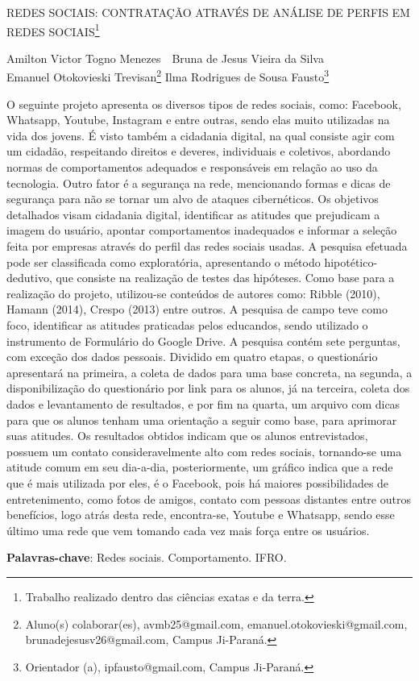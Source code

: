 \documentclass[article,12pt,onesidea,4paper,english,brazil]{abntex2}
\begin{document}
	
	
	\frenchspacing 
	
	\begin{center}
		\LARGE REDES SOCIAIS: CONTRATAÇÃO ATRAVÉS DE ANÁLISE DE PERFIS EM
		REDES SOCIAIS\footnote{Trabalho realizado dentro das ciências exatas e da terra.}
		
		\normalsize
		Amilton Victor Togno Menezes \,\, Bruna de Jesus Vieira da Silva\\Emanuel Otokovieski Trevisan\footnote{Aluno(s) colaborar(es), avmb25@gmail.com, emanuel.otokovieski@gmail.com,
			brunadejesusv26@gmail.com, Campus Ji-Paraná.} 
	Ilma Rodrigues de Sousa Fausto\footnote{Orientador (a), ipfausto@gmail.com, Campus Ji-Paraná.} 
	\end{center}
	
	\noindent O seguinte projeto apresenta os diversos tipos de redes sociais, como: Facebook,
	Whatsapp, Youtube, Instagram e entre outras, sendo elas muito utilizadas na vida
	dos jovens. É visto também a cidadania digital, na qual consiste agir com um
	cidadão, respeitando direitos e deveres, individuais e coletivos, abordando normas
	de comportamentos adequados e responsáveis em relação ao uso da tecnologia.
	Outro fator é a segurança na rede, mencionando formas e dicas de segurança para
	não se tornar um alvo de ataques cibernéticos. Os objetivos detalhados visam
	cidadania digital, identificar as atitudes que prejudicam a imagem do usuário,
	apontar comportamentos inadequados e informar a seleção feita por empresas
	através do perfil das redes sociais usadas. A pesquisa efetuada pode ser
	classificada como exploratória, apresentando o método hipotético-dedutivo, que
	consiste na realização de testes das hipóteses. Como base para a realização do
	projeto, utilizou-se conteúdos de autores como: Ribble (2010), Hamann (2014), Crespo
	(2013) entre outros. A pesquisa de campo teve como foco, identificar as atitudes
	praticadas pelos educandos, sendo utilizado o instrumento de Formulário do Google
	Drive. A pesquisa contém sete perguntas, com exceção dos dados pessoais.
	Dividido em quatro etapas, o questionário apresentará na primeira, a coleta de
	dados para uma base concreta, na segunda, a disponibilização do questionário por
	link para os alunos, já na terceira, coleta dos dados e levantamento de resultados, e
	por fim na quarta, um arquivo com dicas para que os alunos tenham uma orientação
	a seguir como base, para aprimorar suas atitudes. Os resultados obtidos indicam
	que os alunos entrevistados, possuem um contato consideravelmente alto com
	redes sociais, tornando-se uma atitude comum em seu dia-a-dia, posteriormente, um
	gráfico indica que a rede que é mais utilizada por eles, é o Facebook, pois há
	maiores possibilidades de entretenimento, como fotos de amigos, contato com
	pessoas distantes entre outros benefícios, logo atrás desta rede, encontra-se,
	Youtube e Whatsapp, sendo esse último uma rede que vem tomando cada vez mais
	força entre os usuários.
	
	\vspace{\onelineskip}
	
	\noindent
	\textbf{Palavras-chave}: Redes sociais. Comportamento. IFRO.
	
\end{document}

